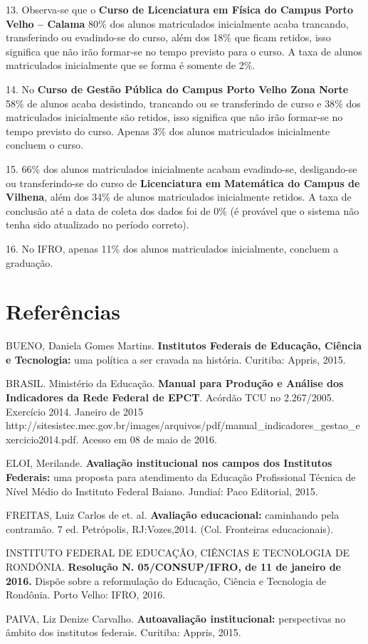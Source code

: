 \documentclass[article,12pt,onesidea,4paper,english,brazil]{abntex2}
\begin{document}
	13. Observa-se que o\textbf{ Curso de Licenciatura em Física do Campus Porto Velho – Calama}
	80\% dos alunos matriculados inicialmente acaba trancando, transferindo ou evadindo-se
	do curso, além dos 18\% que ficam retidos, isso significa que não irão formar-se no tempo
	previsto para o curso. A taxa de alunos matriculados inicialmente que se forma é somente
	de 2\%.
	
	14. No \textbf{Curso de Gestão Pública do Campus Porto Velho Zona Norte} 58\% de alunos
	acaba desistindo, trancando ou se transferindo de curso e 38\% dos matriculados
	inicialmente são retidos, isso significa que não irão formar-se no tempo previsto do curso.
	Apenas 3\% dos alunos matriculados inicialmente concluem o curso.
	
	15. 66\% dos alunos matriculados inicialmente acabam evadindo-se, desligando-se ou
	transferindo-se do curso de \textbf{Licenciatura em Matemática do Campus de Vilhena}, além
	dos 34\% de alunos matriculados inicialmente retidos. A taxa de conclusão até a data de
	coleta dos dados foi de 0\% (é provável que o sistema não tenha sido atualizado no período
	correto).
	
	16. No IFRO, apenas 11\% dos alunos matriculados inicialmente, concluem a graduação.
	
	\section*{Referências}
	
	
	BUENO, Daniela Gomes Martins. \textbf{Institutos Federais de Educação, Ciência e Tecnologia:}
	uma política a ser cravada na história. Curitiba: Appris, 2015.
	
	BRASIL. Ministério da Educação. \textbf{Manual para Produção e Análise dos Indicadores da
	Rede Federal de EPCT}. Acórdão TCU no 2.267/2005. Exercício 2014. Janeiro de 2015
	http://sitesistec.mec.gov.br/images/arquivos/pdf/manual\_indicadores\_gestao\_exercicio2014.pdf.
	Acesso em 08 de maio de 2016.
	
	ELOI, Merilande. \textbf{Avaliação institucional nos campos dos Institutos Federais:} uma proposta
	para atendimento da Educação Profissional Técnica de Nível Médio do Instituto Federal
	Baiano. Jundiaí: Paco Editorial, 2015.
	
	FREITAS, Luiz Carlos de et. al. \textbf{Avaliação educacional:} caminhando pela contramão. 7 ed.
	Petrópolis, RJ:Vozes,2014. (Col. Fronteiras educacionais).
	
	INSTITUTO FEDERAL DE EDUCAÇÃO, CIÊNCIAS E TECNOLOGIA DE RONDÔNIA.
	\textbf{Resolução N. 05/CONSUP/IFRO, de 11 de janeiro de 2016.} Dispõe sobre a reformulação do
	Educação, Ciência e Tecnologia de Rondônia. Porto Velho: IFRO, 2016.
	
	PAIVA, Liz Denize Carvalho. \textbf{Autoavaliação institucional:} perspectivas no âmbito dos
	institutos federais. Curitiba: Appris, 2015.
	
\end{document}
